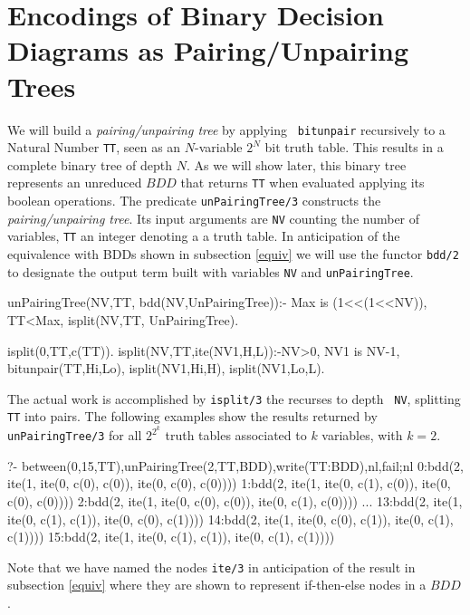 \documentclass[]{INCLUDES/llncs}
\begin{document}
\section{Encodings of Binary Decision Diagrams as Pairing/Unpairing Trees}
\label{encbdd}

We will build a {\em pairing/unpairing tree} by applying {\tt
bitunpair} recursively to a Natural Number {\tt TT}, 
seen as an $N$-variable $2^N$ bit truth table. 
This results in a complete binary tree of depth $N$.
As we will show later, this binary tree represents an unreduced
$BDD$ that returns {\tt TT} when evaluated applying
its boolean operations. The predicate {\tt unPairingTree/3} constructs
the {\em pairing/unpairing tree}. Its input
arguments are {\tt NV} counting the number of variables, 
{\tt TT} an integer denoting a a truth table.
In anticipation of the equivalence with BDDs shown in subsection \ref{equiv}
we will use the functor {\tt bdd/2} to designate the output term built with 
variables {\tt NV} and {\tt unPairingTree}.
\begin{code}
unPairingTree(NV,TT, bdd(NV,UnPairingTree)):-
  Max is (1<<(1<<NV)), TT<Max,
  isplit(NV,TT, UnPairingTree).

isplit(0,TT,c(TT)).
isplit(NV,TT,ite(NV1,H,L)):-NV>0,
  NV1 is NV-1,
  bitunpair(TT,Hi,Lo),
  isplit(NV1,Hi,H),
  isplit(NV1,Lo,L).
\end{code}
The actual work is accomplished by {\tt isplit/3} the recurses to depth {\tt
NV}, splitting {\tt TT} into pairs. The following examples 
show the results returned by {\tt unPairingTree/3} 
for all $2^{2^k}$ truth tables associated to $k$ variables,  with $k=2$.

\begin{codex}
?- between(0,15,TT),unPairingTree(2,TT,BDD),write(TT:BDD),nl,fail;nl
0:bdd(2, ite(1, ite(0, c(0), c(0)), ite(0, c(0), c(0))))
1:bdd(2, ite(1, ite(0, c(1), c(0)), ite(0, c(0), c(0))))
2:bdd(2, ite(1, ite(0, c(0), c(0)), ite(0, c(1), c(0))))
...
13:bdd(2, ite(1, ite(0, c(1), c(1)), ite(0, c(0), c(1))))
14:bdd(2, ite(1, ite(0, c(0), c(1)), ite(0, c(1), c(1))))
15:bdd(2, ite(1, ite(0, c(1), c(1)), ite(0, c(1), c(1))))
\end{codex}
Note that we have named the nodes {\tt ite/3} in anticipation of the result in
subsection \ref{equiv} where they are shown to represent if-then-else nodes in a
$BDD$.
\end{document}
